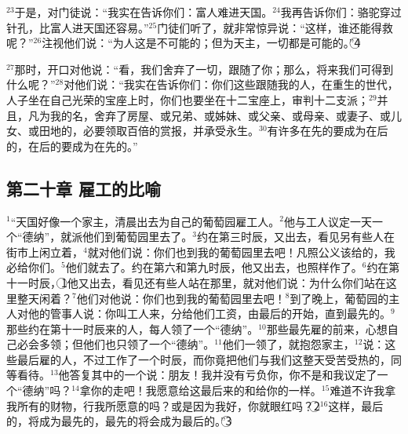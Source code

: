 $^{23}$于是，\UL[耶稣]对门徒说：“我实在告诉你们：富人难进天国。$^{24}$我再告诉你们：骆驼穿过针孔，比富人进天国还容易。”$^{25}$门徒们听了，就非常惊异说：“这样，谁还能得救呢？”$^{26}$\UL[耶稣]注视他们说：“为人这是不可能的；但为天主，一切都是可能的。”\textcircled{4}

$^{27}$那时，\UL[伯多禄]开口对他说：“看，我们舍弃了一切，跟随了你；那么，将来我们可得到什么呢？”$^{28}$\UL[耶稣]对他们说：“我实在告诉你们：你们这些跟随我的人，在重生的世代，人子坐在自己光荣的宝座上时，你们也要坐在十二宝座上，审判\UL[以色列]十二支派；$^{29}$并且，凡为我的名，舍弃了房屋、或兄弟、或姊妹、或父亲、或母亲、或妻子、或儿女、或田地的，必要领取百倍的赏报，并承受永生。$^{30}$有许多在先的要成为在后的，在后的要成为在先的。”


\subsection{第二十章 雇工的比喻}
$^{1}$“天国好像一个家主，清晨出去为自己的葡萄园雇工人。$^{2}$他与工人议定一天一个“德纳”，就派他们到葡萄园里去了。$^{3}$约在第三时辰，又出去，看见另有些人在街市上闲立着，$^{4}$就对他们说：你们也到我的葡萄园里去吧！凡照公义该给的，我必给你们。$^{5}$他们就去了。约在第六和第九时辰，他又出去，也照样作了。$^{6}$约在第十一时辰，\textcircled{1}他又出去，看见还有些人站在那里，就对他们说：为什么你们站在这里整天闲着？$^{7}$他们对他说：你们也到我的葡萄园里去吧！$^{8}$到了晚上，葡萄园的主人对他的管事人说：你叫工人来，分给他们工资，由最后的开始，直到最先的。$^{9}$那些约在第十一时辰来的人，每人领了一个“德纳”。$^{10}$那些最先雇的前来，心想自己必会多领；但他们也只领了一个“德纳”。$^{11}$他们一领了，就抱怨家主，$^{12}$说：这些最后雇的人，不过工作了一个时辰，而你竟把他们与我们这整天受苦受热的，同等看待。$^{13}$他答复其中的一个说：朋友！我并没有亏负你，你不是和我议定了一个“德纳”吗？$^{14}$拿你的走吧！我愿意给这最后来的和给你的一样。$^{15}$难道不许我拿我所有的财物，行我所愿意的吗？或是因为我好，你就眼红吗？\textcircled{2}$^{16}$这样，最后的，将成为最先的，最先的将会成为最后的。”\textcircled{3}


